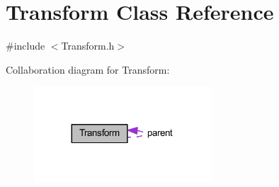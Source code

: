 \hypertarget{class_transform}{}\section{Transform Class Reference}
\label{class_transform}


{\ttfamily \#include $<$Transform.\+h$>$}



Collaboration diagram for Transform\+:\nopagebreak
\begin{figure}[H]
\begin{center}
\leavevmode
\includegraphics[width=188pt]{class_transform__coll__graph}
\end{center}
\end{figure}
